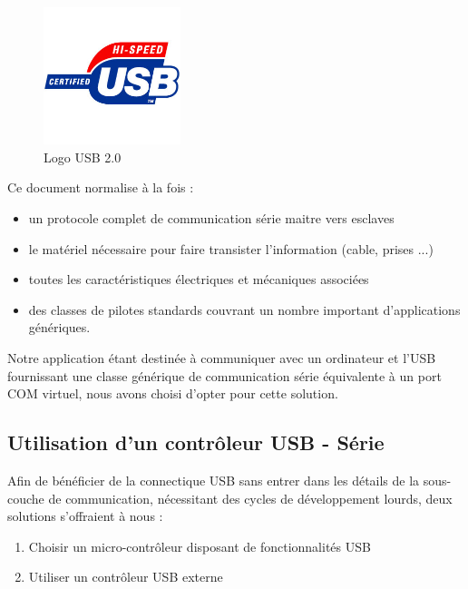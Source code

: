 \documentclass[11pt, french]{article} %
\begin{document}

\begin{figure}
	\includegraphics[width = 4cm]{SolutionNumerique/usb-logo.jpg}
	\caption{Logo USB 2.0}
\end{figure}

\medskip
Ce document normalise à la fois : 
\medskip
\begin{itemize}
	\item un protocole complet de communication série maitre vers esclaves
	\item le matériel nécessaire pour faire transister l'information (cable, prises ...)
	\item toutes les caractéristiques électriques et mécaniques associées
	\item des classes de pilotes standards couvrant un nombre important d'applications génériques.
\end{itemize}

\medskip
Notre application étant destinée à communiquer avec un ordinateur et l'USB fournissant une classe générique de communication série équivalente à un port COM virtuel, nous avons choisi d'opter pour cette solution.

\subsection{Utilisation d'un contrôleur USB - Série}

	Afin de bénéficier de la connectique USB sans entrer dans les détails de la sous-couche de communication, nécessitant des cycles de développement lourds, deux solutions s'offraient à nous :

\medskip
\begin{enumerate}
	\item Choisir un micro-contrôleur disposant de fonctionnalités USB
	\item Utiliser un contrôleur USB externe
\end{enumerate}
\end{document}
